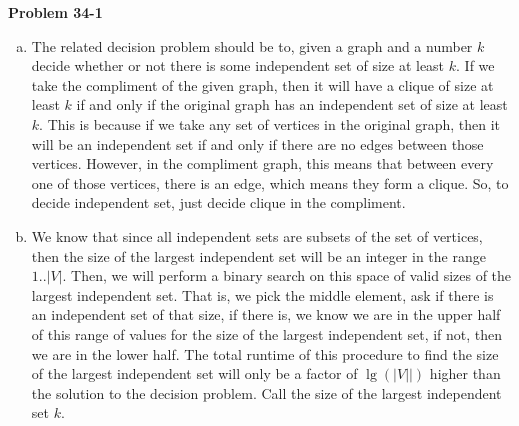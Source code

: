 \documentclass{article}
\begin{document}
\noindent\textbf{Problem 34-1}\\
\begin{enumerate}[a)]
\item The related decision problem should be to, given a graph and a number $k$ decide whether or not there is some independent set of size at least $k$. If we take the compliment of the given graph, then it will have a clique of size at least $k$ if and only if the original graph has an independent set of size at least $k$. This is because if we take any set of vertices in the original graph, then it will be an independent set if and only if there are no edges between those vertices. However, in the compliment graph, this means that between every one of those vertices, there is an edge, which means they form a clique. So, to decide independent set, just decide clique in the compliment.
\item
We know that since all independent sets are subsets of the set of vertices, then the size of the largest independent set will be an integer in the range $1..|V|$. Then, we will perform a binary search on this space of valid sizes of the largest independent set. That is, we pick the middle element, ask if there is an independent set of that size, if there is, we know we are in the upper half of this range of values for the size of the largest independent set, if not, then we are in the lower half. The total runtime of this procedure to find the size of the largest independent set will only be a factor of $\lg(|V||)$ higher than the solution to the decision problem. Call the size of the largest independent set $k$.


\end{enumerate}
\end{document}
